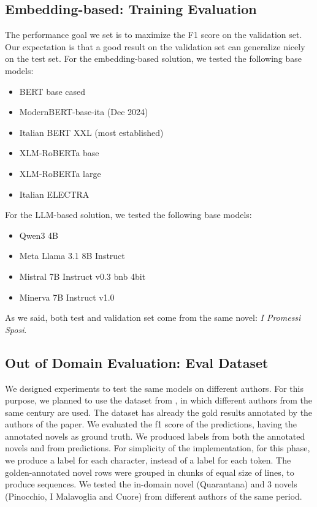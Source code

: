 \documentclass[11pt]{article}
\begin{document}
\subsection{Embedding-based: Training Evaluation}
The performance goal we set is to maximize the F1 score on the validation set. Our expectation is that a good result on the validation set can generalize nicely on the test set. \newline For the embedding-based solution, we tested the following base models:
 \begin{itemize}
 	\item BERT base cased
	\item ModernBERT-base-ita (Dec 2024)
	\item Italian BERT XXL (most established)
	\item XLM-RoBERTa base
	\item XLM-RoBERTa large
	\item Italian ELECTRA
\end{itemize}
For the LLM-based solution, we tested the following base models:
 \begin{itemize}
 	\item Qwen3 4B
	\item Meta Llama 3.1 8B Instruct
	\item Mistral 7B Instruct v0.3 bnb 4bit
	\item Minerva 7B Instruct v1.0
\end{itemize}
As we said, both test and validation set come from the same novel: \emph{I Promessi Sposi}. 

\subsection{Out of Domain Evaluation: Eval Dataset}
We designed experiments to test the same models on different authors.
For this purpose, we planned to use the dataset from \cite{redaelli-sprugnoli-2024-sentence}, in which different authors from the same century are used. \newline The dataset has already the gold results annotated by the authors of the paper. \newline We evaluated the f1 score of the predictions, having the annotated
novels as ground truth. \newline We produced labels from both the annotated novels and from predictions. For simplicity of the implementation, for this phase, we produce a label for each character, instead of a label for each token. \newline The golden-annotated novel rows were grouped in chunks of equal size of lines, to produce sequences. \newline We tested the in-domain novel (Quarantana) and 3 novels (Pinocchio, I Malavoglia and Cuore) from different authors of the same period.
\end{document}
